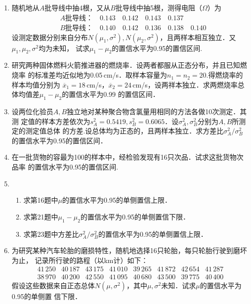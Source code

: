 \documentclass[10pt,a4paper]{article}
\begin{document}
\begin{enumerate}
    \item 随机地从$A$批导线中抽4根，又从$B$批导线中抽5根，测得电阻（$\Omega$）为
    \begin{equation}
        \begin{split}
            & A\mbox{批导线：} \quad  0.143 \quad 0.142 \quad 0.143 \quad 0.137\\
            & B\mbox{批导线：} \quad  0.140 \quad 0.142 \quad 0.136 \quad 0.138 \quad 0.140
        \end{split}
        \nonumber
    \end{equation}
    设测定数据分别来自分布$N(\mu_1,\sigma^2),N(\mu_2,\sigma^2)$，且两样本相互独立．又$\mu_1,\mu_2,\sigma^2$均为未知，
    试求$\mu_1-\mu_2$的置信水平为0.95的置信区间.




    \item 研究两种固体燃料火箭推进器的燃烧率．设两者都服从正态分布，并且已知燃烧率
    的标准差均近似地为0.05$\, $cm/s．取样本容量为$n_1=n_2=20$.得燃烧率的样本均值分别为
    $\overline{x}_1=18\, $cm/s，$\overline{x}_2=24\, $cm/s，设两祥本独立．求两燃烧率总体均值差$\mu_1-\mu_2$的置信水平为0.99
    的置信区间．




    \item 设两位化验员$A, B$独立地对某种聚合物含氯量用相同的方法各做10次测定．其测
    定值的样本方差依次为$s_A^2=0.5419,s_B^2=0.6065$．设$\sigma_A^2,\sigma_B^2$分别为$A,B$所测定的测定值总体
    的方差.设总体均为正态的，且两样本独立．求方差比$\sigma_A^2/\sigma_B^2$的置信水平为0.95的置信区间．


    \item 在一批货物的容最为100的样本中，经检验发现有16只次品．试求这批货物次品率
    的置信水平为0.95的置信区间.




    \item \begin{enumerate}
        \item 求第16题中$\mu$的置信水平为0.95的单侧置信上限．
        \item 求第21题中$\mu_1-\mu_2$的置信水平为0.95的单侧置信下限．
        \item 求第23题中方差比$\sigma_A^2/\sigma_B^2$的置信水平为0.95的单侧置信上限．
    \end{enumerate}




    \item 为研究某种汽车轮胎的磨损特性，随机地选择16只轮胎，每只轮胎行驶到磨坏为止，
    记录所行驶的路程（以km计）如下：
    $$\begin{array}{cccccccc}
        41\, 250 & 40\, 187 & 43\, 175 & 41\, 010 & 39\, 265 & 41\, 872 & 42\, 654 & 41\, 287\\
        38\, 970 & 40\, 200 & 42\, 550 & 41\, 095 & 40\, 680 & 43\, 500 & 39\, 775 & 40\, 400 
    \end{array}$$
    假设这些数据来自正态总体$N(\mu,\sigma^2)$，其中$\mu,\sigma^2$未知．试求$\mu$的置信水平为0.95的单侧置
    信下限．




\end{enumerate}
\end{document}
